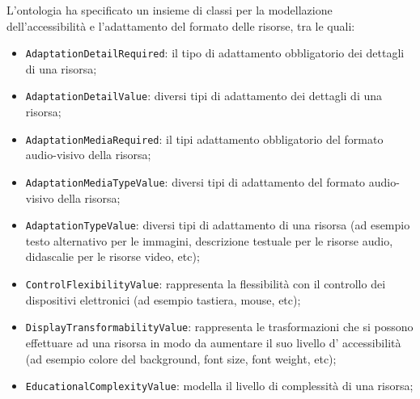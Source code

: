 L'ontologia ha specificato un insieme di classi per la modellazione dell'accessibilità e l'adattamento del formato delle risorse, tra le quali:
\begin{itemize}
    \item \texttt{AdaptationDetailRequired}: il tipo di adattamento obbligatorio dei dettagli di una risorsa;
    \item \texttt{AdaptationDetailValue}: diversi tipi di adattamento dei dettagli di una risorsa;
    \item \texttt{AdaptationMediaRequired}: il tipi adattamento obbligatorio del formato audio-visivo della risorsa;
    \item \texttt{AdaptationMediaTypeValue}: diversi tipi di adattamento del formato audio-visivo della risorsa;
    \item \texttt{AdaptationTypeValue}: diversi tipi di adattamento di una risorsa (ad esempio testo alternativo per le immagini, descrizione testuale per le risorse audio, didascalie per le risorse video, etc);
    \item \texttt{ControlFlexibilityValue}: rappresenta la flessibilità con il controllo dei dispositivi elettronici (ad esempio tastiera, mouse, etc);
    \item \texttt{DisplayTransformabilityValue}: rappresenta le trasformazioni che si possono effettuare ad una risorsa in modo da aumentare il suo livello d' accessibilità (ad esempio colore del background, font size, font weight, etc);
    \item \texttt{EducationalComplexityValue}: modella il livello di complessità di una risorsa;
\end{itemize}
